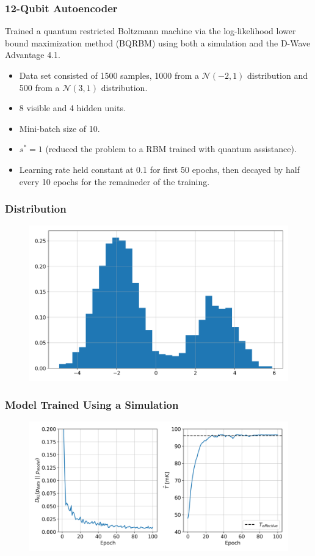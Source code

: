 \documentclass{beamer}
\begin{document}
\begin{frame}
    \frametitle{12-Qubit Autoencoder}
    Trained a quantum restricted Boltzmann machine via the log-likelihood lower bound maximization method (BQRBM) using both a simulation and the D-Wave Advantage 4.1.
    \begin{itemize}
        \item Data set consisted of 1500 samples, 1000 from a \( \mathcal{N}(-2, 1) \) distribution and 500 from a \( \mathcal{N}(3, 1) \) distribution.
        \item 8 visible and 4 hidden units.
        \item Mini-batch size of 10.
        \item \( s^* = 1 \) (reduced the problem to a RBM trained with quantum assistance).
        \item Learning rate held constant at 0.1 for first 50 epochs, then decayed by half every 10 epochs for the remaineder of the training.
    \end{itemize}
\end{frame}

\begin{frame}
    \frametitle{Distribution}
    \begin{figure}
        \includegraphics[width=1\linewidth]{qbm/8x4/Advantage_system4.1/hist_data.png}
    \end{figure}
\end{frame}

\begin{frame}
    \frametitle{Model Trained Using a Simulation}
    \begin{figure}
        \includegraphics[width=1\linewidth]{qbm/8x4/Advantage_system4.1/train_results_exact.png}
    \end{figure}
\end{frame}
\end{document}
